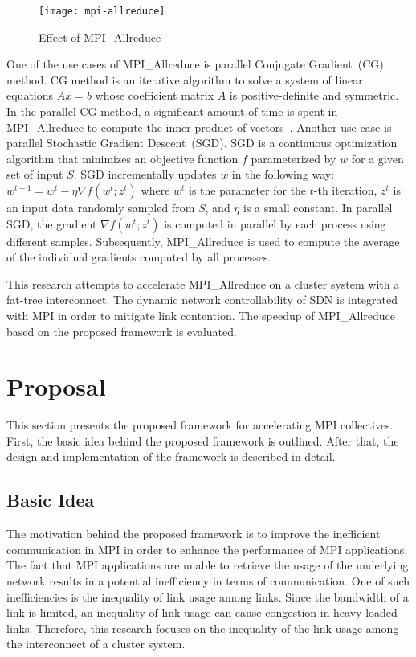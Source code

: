 \begin{figure}
    \centering
    \texttt{[image: mpi-allreduce]}
    \caption{Effect of MPI\_Allreduce}%
    \label{fig:mpi-allreduce}
\end{figure}

One of the use cases of MPI\_Allreduce is parallel Conjugate Gradient~(CG)
method. CG method is an iterative algorithm to solve a system of linear
equations $Ax = b$ whose coefficient matrix $A$ is positive-definite and
symmetric. In the parallel CG method, a significant amount of time is spent in
MPI\_Allreduce to compute the inner product of
vectors~\autocite{Kandalla2012}. Another use case is parallel Stochastic
Gradient Descent~(SGD). SGD is a continuous optimization algorithm that
minimizes an objective function $f$ parameterized by $w$ for a given set of
input $S$. SGD incrementally updates $w$ in the following way: $w^{t+1}=w^t-
\eta \nabla f(w^t; z^t)$ where $w^t$ is the parameter for the $t$-th
iteration, $z^t$ is an input data randomly sampled from $S$, and $\eta$ is a
small constant. In parallel SGD, the gradient $\nabla f(w^t; z^t)$ is computed
in parallel by each process using different samples. Subsequently,
MPI\_Allreduce is used to compute the average of the individual gradients
computed by all processes.

This research attempts to accelerate MPI\_Allreduce on a cluster system with a
fat-tree interconnect. The dynamic network controllability of SDN is
integrated with MPI in order to mitigate link contention. The speedup of
MPI\_Allreduce based on the proposed framework is evaluated.

\section{Proposal}\label{sec:iii-proposal}

This section presents the proposed framework for accelerating MPI collectives.
First, the basic idea behind the proposed framework is outlined. After that,
the design and implementation of the framework is described in detail.

\subsection{Basic Idea}

The motivation behind the proposed framework is to improve the inefficient communication
in MPI in order to enhance the performance of MPI applications. The fact that
MPI applications are unable to retrieve the usage of the underlying network
results in a potential inefficiency in terms of communication. One of such
inefficiencies is the inequality of link usage among links. Since the
bandwidth of a link is limited, an inequality of link usage can cause
congestion in heavy-loaded links. Therefore, this research focuses on the
inequality of the link usage among the interconnect of a cluster system.

